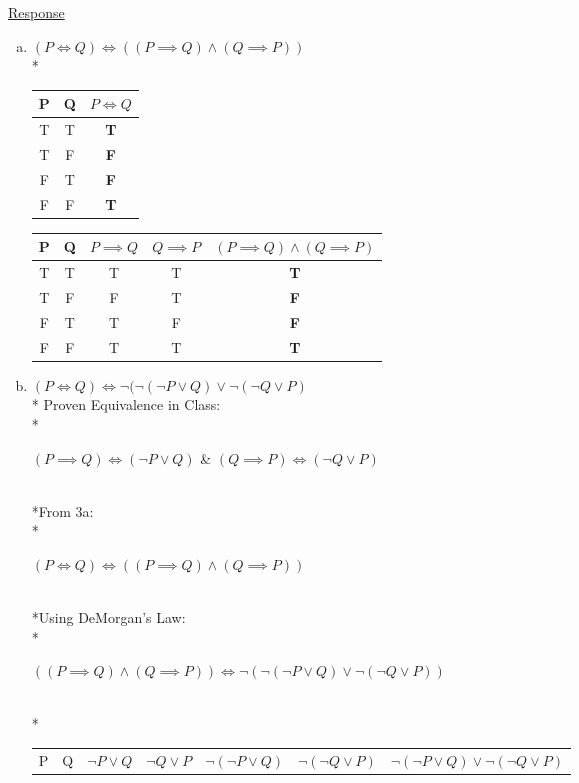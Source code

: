 \documentclass[12pt]{article}
\begin{document}
\medskip
\uline{Response}
\begin{enumerate}[(a)]
\item $(P \iff Q) \iff ((P \implies Q) \land (Q \implies P))$
\vspace{0.25in}
\\*\begin{tabular}{c|c|c}
P & Q & $P \iff Q$\\
\hline
T & T & \textbf{T}\\
T & F & \textbf{F}\\
F & T & \textbf{F}\\
F & F & \textbf{T}\\
\end{tabular}
\qquad
\begin{tabular}{c|c|c|c|c}
P & Q & $P \implies Q$ & $Q \implies P$ & $(P \implies Q) \land (Q \implies P)$\\
\hline
T & T & T & T & \textbf{T}\\
T & F & F & T & \textbf{F}\\
F & T & T & F & \textbf{F}\\
F & F & T & T & \textbf{T}\\
\end{tabular}
\smallskip
\item $(P \iff Q) \iff \neg (\neg(\neg P \lor Q) \lor \neg(\neg Q \lor P)$
\vspace{0.25in}
\\* Proven Equivalence in Class:
\\*\centerline{$(P \implies Q) \iff (\neg P \lor Q)$ \hspace{0.25in} \& \hspace{0.25in} $(Q \implies P) \iff (\neg Q \lor P)$}
\medskip
\\*From 3a: 
\\*\centerline{$(P \iff Q) \iff ((P \implies Q) \land (Q \implies P))$}
\medskip
\\*Using DeMorgan's Law: 
\\*\centerline{$((P \implies Q) \land (Q \implies P)) \iff \neg (\neg(\neg P \lor Q) \lor \neg(\neg Q \lor P))$}
\vspace{0.25in}
\\*\begin{tabular}{c|c|c|c|c|c|c}
P & Q & 
$\neg P \lor Q$ & 
$\neg Q \lor P$ & 
$\neg (\neg P \lor Q)$ & 
$\neg (\neg Q \lor P)$ & 
$\neg (\neg P \lor Q) \lor \neg (\neg Q \lor P)$\\ 

\end{tabular}
\end{enumerate}
\end{document}

